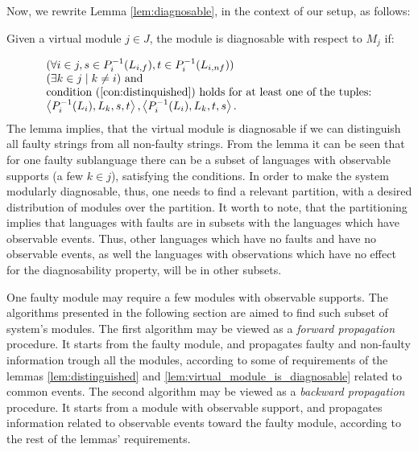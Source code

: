 Now, we rewrite Lemma \ref{lem:diagnosable}, in the context of our setup, as
follows:
\begin{lemma}
\label{lem:virtual_module_is_diagnosable}
Given a virtual module $j \in J$, the module is diagnosable with respect to
$M_j$ if:
\end{lemma}
\begin{equation}
	\begin{array}{l}
		(\forall i \in j, 
			s \in P_i^{-1}(L_{i,f}), 
			t \in P_i^{-1}(L_{i,nf}))
		\\
		(\exists k \in j \mid k \neq i) \textrm{ and }
		\\
		\textrm{condition (\ref{con:distinquished}) holds for at least one of
		the tuples:}
		\\
		\left<P_i^{-1}(L_i), L_k, s, t \right>,
		\left<P_i^{-1}(L_i), L_k, t, s \right>.
	\end{array}
\end{equation}
The lemma implies, that the virtual module is diagnosable if we can distinguish
all faulty strings from all non-faulty strings. 
From the lemma it can be seen that for one faulty sublanguage there can be a
subset of languages with observable supports (a few $k\in j$), satisfying the
conditions.
In order to make the system modularly diagnosable, thus, one needs to find a
relevant partition, with a desired distribution of modules over the partition.
It worth to note, that the partitioning implies that languages with faults are
in subsets with the languages which have observable events. Thus, other
languages which have no faults and have no observable events, as well the
languages with observations which have no effect for the diagnosability
property, will be in other subsets.

One faulty module may require a few modules with observable supports.
The algorithms presented in the following section are aimed to find such subset
of system's modules. The first algorithm may be viewed as a \emph{forward
propagation} procedure. It starts from the faulty module, and propagates faulty
and non-faulty information trough all the modules, according to some
of requirements of the lemmas \ref{lem:distinguished} and
\ref{lem:virtual_module_is_diagnosable} related to common events. The second
algorithm may be viewed as a \emph{backward propagation} procedure. It starts
from a module with observable support, and propagates information related to
observable events toward the faulty module, according to the rest of the lemmas'
requirements.


